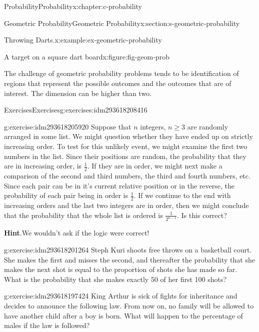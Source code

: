 \documentclass[twoside,10pt,]{book}
\newcommand{\blocktitlefont}{\relax}
\numberwithin{equation}{section}
\begin{document}
\begin{chapterptx}{Probability}{}{Probability}{}{}{x:chapter:c-probability}
\begin{sectionptx}{Geometric Probability}{}{Geometric Probability}{}{}{x:section:s-geometric-probability}
\begin{example}{Throwing Darts.}{x:example:ex-geometric-probability}
\begin{figureptx}{A target on a square dart board}{x:figure:fig-geom-prob}{}
\begin{image}{0.2}{0.6}{0.2}
\end{image}%
\tcblower
\end{figureptx}%
\end{example}
The challenge of geometric probability problems tends to be identification of regions that represent the possible outcomes and the outcomes that are of interest. The dimension can be higher than two.%
\end{sectionptx}
%
%
\typeout{************************************************}
\typeout{************************************************}
%
\begin{exercises-section}{Exercises}{}{Exercises}{}{}{g:exercises:idm293618208416}
\begin{divisionexercise}{1}{}{}{g:exercise:idm293618205920}%
Suppose that \(n\)  integers, \(n \geq 3\) are randomly arranged in some list.  We might question whether they have ended up on strictly increasing order.   To test for this unlikely event, we might examine the first two numbers in the list.  Since their positions are random, the probability that they are in increasing order, is \(\frac{1}{2}\). If they are in order, we might next make a comparison of the second and third numbers, the third and fourth numbers, etc. Since each pair can be in it's current relative position or in the reverse, the probability of each pair being in order is \(\frac{1}{2}\). If we continue to the end with increasing orders and the last two integers are in order, then we might conclude that the probability that the whole list is ordered is \(\frac{1}{2^{n-1}}\).  Is this correct?%
\par\smallskip%
\noindent\textbf{\blocktitlefont Hint}.\label{g:hint:idm293618205088}{}\hypertarget{g:hint:idm293618205088}{}\quad{}We wouldn't ask if the logic were correct!%
\end{divisionexercise}%
\begin{divisionexercise}{2}{}{}{g:exercise:idm293618201264}%
Steph Kuri shoots free throws on a basketball court. She makes the first and misses the second, and thereafter the probability that she makes the next shot is equal to the proportion of shots she has made so far. What is the probability that she makes exactly 50 of her first 100 shots?%
\end{divisionexercise}%
\begin{divisionexercise}{3}{}{}{g:exercise:idm293618197424}%
King Arthur is sick of fights for inheritance and decides to announce the following law. From now on, no family will be allowed to have another child after a boy is born. What will happen to the percentage of males if the law is followed?%

\end{divisionexercise}
\end{exercises-section}
\end{chapterptx}
\end{document}
